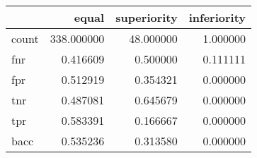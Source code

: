 \begin{tabular}{lrrr}
\toprule
{} &       equal &  superiority &  inferiority \\
\midrule
count &  338.000000 &    48.000000 &     1.000000 \\
fnr   &    0.416609 &     0.500000 &     0.111111 \\
fpr   &    0.512919 &     0.354321 &     0.000000 \\
tnr   &    0.487081 &     0.645679 &     0.000000 \\
tpr   &    0.583391 &     0.166667 &     0.000000 \\
bacc  &    0.535236 &     0.313580 &     0.000000 \\
\bottomrule
\end{tabular}

